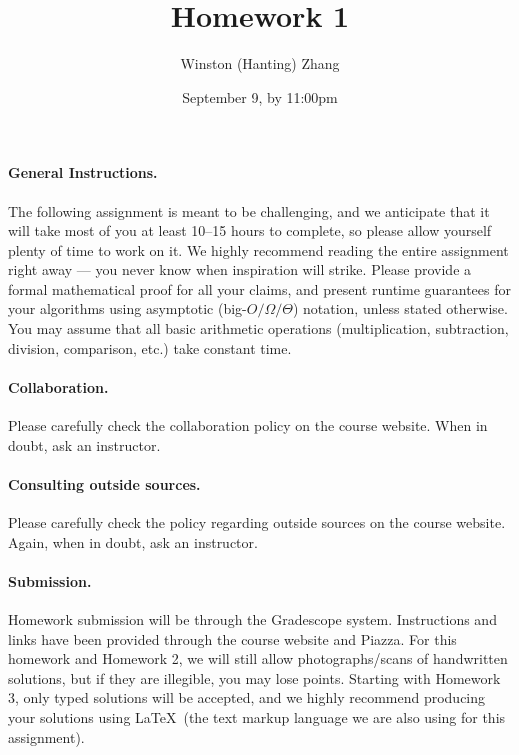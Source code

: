 \documentclass[10pt]{article}
\title{\bf Homework 1}
\author{Winston (Hanting) Zhang}
\date{September 9, by 11:00pm}
\begin{document}
\maketitle

\paragraph{General Instructions.} The following assignment is meant to be challenging, and we anticipate that it will take most of you at least 10--15 hours to complete, so please allow yourself plenty of time to work on it.
We highly recommend reading the entire assignment right away --- you never know when inspiration will strike.
Please provide a formal mathematical proof for all your claims, and  present runtime guarantees for your algorithms using asymptotic (big-$O/\Omega/\Theta$) notation, unless stated otherwise. You may assume that all basic arithmetic operations (multiplication, subtraction, division, comparison, etc.) take constant time. %

\paragraph{Collaboration.}  Please carefully check the collaboration policy on the course website. When in doubt, ask an instructor.

\paragraph{Consulting outside sources.} Please carefully check the policy regarding outside sources on the course website. Again, when in doubt, ask an instructor.

\paragraph{Submission.} Homework submission will be through the Gradescope system. Instructions and links have been provided through the course website and Piazza. For this homework and Homework 2, we will still allow photographs/scans of handwritten solutions, but if they are illegible, you may lose points. Starting with Homework 3, only typed solutions will be accepted, and we highly recommend producing your solutions using \LaTeX~(the text markup language we are also using for this assignment).
\end{document}
